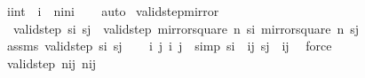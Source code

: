 \begin{isabellebody}
\isanewline
%
\endisadelimproof
\isanewline
{}\isamarkupfalse%
\ {\isachardoublequoteopen}{\isacharparenleft}{\kern0pt}i{\isacharcolon}{\kern0pt}{\isacharcolon}{\kern0pt}int{\isacharparenright}{\kern0pt}\ {\isacharequal}{\kern0pt}\ i{\isacharprime}{\kern0pt}{\isacharplus}{\kern0pt}{}\ {\isasymLongrightarrow}\ n{\isacharminus}{\kern0pt}i{\isacharequal}{\kern0pt}n{\isacharminus}{\kern0pt}{\isacharparenleft}{\kern0pt}i{\isacharprime}{\kern0pt}{\isacharplus}{\kern0pt}{}{\isacharparenright}{\kern0pt}{\isachardoublequoteclose}\isanewline
%
\isadelimproof
\ \ %
\endisadelimproof
%
\isatagproof
{}\isamarkupfalse%
\ auto%
\endisatagproof
{\isafoldproof}%
%
\isadelimproof
\isanewline
%
\endisadelimproof
\isanewline
{}\isamarkupfalse%
\ valid{\isacharunderscore}{\kern0pt}step{\isacharunderscore}{\kern0pt}mirror{}{\isacharcolon}{\kern0pt}\ \isanewline
\ \ {\isachardoublequoteopen}valid{\isacharunderscore}{\kern0pt}step\ s\isactrlsub i\ s\isactrlsub j\ {\isasymlongleftrightarrow}\ valid{\isacharunderscore}{\kern0pt}step\ {\isacharparenleft}{\kern0pt}mirror{}{\isacharunderscore}{\kern0pt}square\ n\ s\isactrlsub i{\isacharparenright}{\kern0pt}\ {\isacharparenleft}{\kern0pt}mirror{}{\isacharunderscore}{\kern0pt}square\ n\ s\isactrlsub j{\isacharparenright}{\kern0pt}{\isachardoublequoteclose}\ \isanewline
%
\isadelimproof
%
\endisadelimproof
%
\isatagproof
{}\isamarkupfalse%
\isanewline
\ \ \isamarkupfalse%
\ assms{\isacharcolon}{\kern0pt}\ {\isachardoublequoteopen}valid{\isacharunderscore}{\kern0pt}step\ s\isactrlsub i\ s\isactrlsub j{\isachardoublequoteclose}\isanewline
\ \ \isamarkupfalse%
\ i\ j\ i{\isacharprime}{\kern0pt}\ j{\isacharprime}{\kern0pt}\ \ {\isacharbrackleft}{\kern0pt}simp{\isacharbrackright}{\kern0pt}{\isacharcolon}{\kern0pt}\ {\isachardoublequoteopen}s\isactrlsub i\ {\isacharequal}{\kern0pt}\ {\isacharparenleft}{\kern0pt}i{\isacharcomma}{\kern0pt}j{\isacharparenright}{\kern0pt}{\isachardoublequoteclose}\ {\isachardoublequoteopen}s\isactrlsub j\ {\isacharequal}{\kern0pt}\ {\isacharparenleft}{\kern0pt}i{\isacharprime}{\kern0pt}{\isacharcomma}{\kern0pt}j{\isacharprime}{\kern0pt}{\isacharparenright}{\kern0pt}{\isachardoublequoteclose}\ \isamarkupfalse%
\ force\isanewline
\ \ \isamarkupfalse%
\ \isamarkupfalse%
\ {\isachardoublequoteopen}valid{\isacharunderscore}{\kern0pt}step\ {\isacharparenleft}{\kern0pt}n{\isacharminus}{\kern0pt}i{\isacharcomma}{\kern0pt}j{\isacharparenright}{\kern0pt}\ {\isacharparenleft}{\kern0pt}n{\isacharminus}{\kern0pt}i{\isacharprime}{\kern0pt}{\isacharcomma}{\kern0pt}j{\isacharprime}{\kern0pt}{\isacharparenright}{\kern0pt}{\isachardoublequoteclose}\isanewline

\end{isabellebody}
